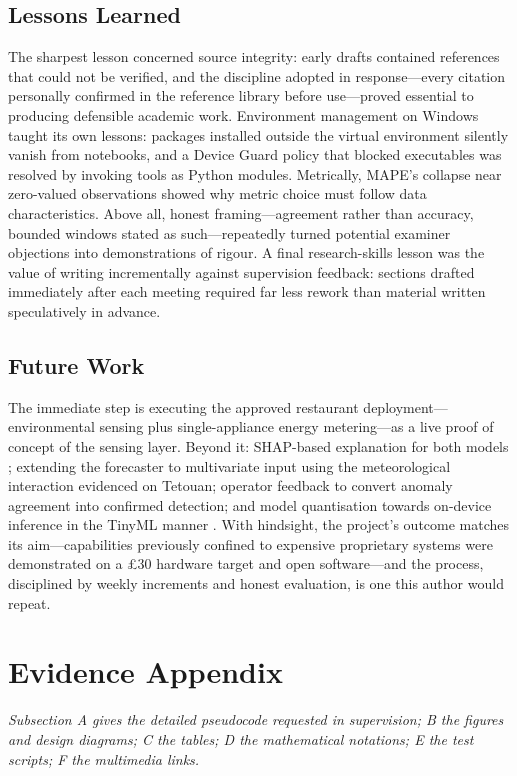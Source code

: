 \documentclass[11pt,a4paper]{article}
\begin{document}
\subsection{Lessons Learned}
The sharpest lesson concerned source integrity: early drafts contained
references that could not be verified, and the discipline adopted in
response---every citation personally confirmed in the reference library before
use---proved essential to producing defensible academic work. Environment
management on Windows taught its own lessons: packages installed outside the
virtual environment silently vanish from notebooks, and a Device Guard policy
that blocked executables was resolved by invoking tools as Python modules.
Metrically, MAPE's collapse near zero-valued observations showed why metric
choice must follow data characteristics. Above all, honest framing---agreement
rather than accuracy, bounded windows stated as such---repeatedly turned
potential examiner objections into demonstrations of rigour. A final
research-skills lesson was the value of writing incrementally against
supervision feedback: sections drafted immediately after each meeting required
far less rework than material written speculatively in advance.

\subsection{Future Work}
The immediate step is executing the approved restaurant deployment---
environmental sensing plus single-appliance energy metering---as a live proof of
concept of the sensing layer. Beyond it: SHAP-based explanation for both models
\cite{lundberg2017unified}; extending the forecaster to multivariate input using
the meteorological interaction evidenced on Tetouan; operator feedback to
convert anomaly agreement into confirmed detection; and model quantisation
towards on-device inference in the TinyML manner \cite{warden2019tinyml}. With
hindsight, the project's outcome matches its aim---capabilities previously
confined to expensive proprietary systems were demonstrated on a \pounds30
hardware target and open software---and the process, disciplined by weekly
increments and honest evaluation, is one this author would repeat.

\clearpage
\section{Evidence Appendix}
{\itshape Subsection A gives the detailed pseudocode requested in supervision;
B the figures and design diagrams; C the tables; D the mathematical notations;
E the test scripts; F the multimedia links.}
\end{document}
